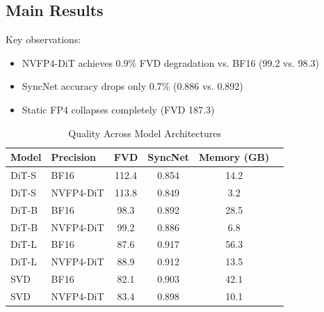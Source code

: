 \documentclass[journal,twoside]{IEEEtran}
\theoremstyle{definition}
\theoremstyle{remark}
\begin{document}
\FloatBarrier
\subsection{Main Results}

\begin{table}[H]
\centering
\caption{Quality Comparison on WebVid-10M Test Set}
\label{tab:main_results}
\end{table}

Key observations:
\begin{itemize}
    \item NVFP4-DiT achieves 0.9\% FVD degradation vs. BF16 (99.2 vs. 98.3)
    \item SyncNet accuracy drops only 0.7\% (0.886 vs. 0.892)
    \item Static FP4 collapses completely (FVD 187.3)
\end{itemize}

\begin{table}[H]
\centering
\caption{Quality Across Model Architectures}
\label{tab:architectures}
\begin{tabular}{llcccc}
\toprule
Model & Precision & FVD & SyncNet & Memory (GB) \\
\midrule
DiT-S & BF16 & 112.4 & 0.854 & 14.2 \\
DiT-S & NVFP4-DiT & 113.8 & 0.849 & 3.2 \\
\midrule
DiT-B & BF16 & 98.3 & 0.892 & 28.5 \\
DiT-B & NVFP4-DiT & 99.2 & 0.886 & 6.8 \\
\midrule
DiT-L & BF16 & 87.6 & 0.917 & 56.3 \\
DiT-L & NVFP4-DiT & 88.9 & 0.912 & 13.5 \\
\midrule
SVD & BF16 & 82.1 & 0.903 & 42.1 \\
SVD & NVFP4-DiT & 83.4 & 0.898 & 10.1 \\
\bottomrule
\end{tabular}
\end{table}
\end{document}
